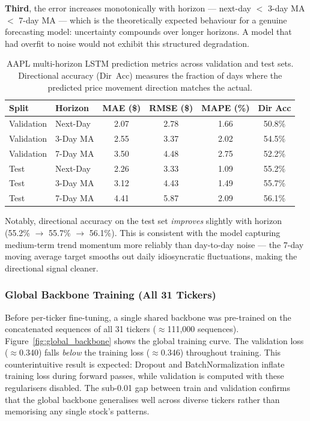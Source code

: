 \documentclass[12pt, a4paper]{article}
\begin{document}
\textbf{Third}, the error increases monotonically with horizon --- next-day
$<$ 3-day MA $<$ 7-day MA --- which is the theoretically expected behaviour
for a genuine forecasting model: uncertainty compounds over longer horizons.
A model that had overfit to noise would not exhibit this structured degradation.

\begin{table}[h]
\centering
\caption{AAPL multi-horizon LSTM prediction metrics across validation and
         test sets. Directional accuracy (Dir~Acc) measures the fraction of
         days where the predicted price movement direction matches the actual.}
\label{tab:multi_horizon_aapl}
\renewcommand{\arraystretch}{1.3}
\begin{tabular}{llcccc}
\hline
\textbf{Split} & \textbf{Horizon}
  & \textbf{MAE (\$)} & \textbf{RMSE (\$)}
  & \textbf{MAPE (\%)} & \textbf{Dir Acc} \\
\hline
Validation & Next-Day & 2.07 & 2.78 & 1.66 & 50.8\% \\
Validation & 3-Day MA & 2.55 & 3.37 & 2.02 & 54.5\% \\
Validation & 7-Day MA & 3.50 & 4.48 & 2.75 & 52.2\% \\
\hline
Test       & Next-Day & 2.26 & 3.33 & 1.09 & 55.2\% \\
Test       & 3-Day MA & 3.12 & 4.43 & 1.49 & 55.7\% \\
Test       & 7-Day MA & 4.41 & 5.87 & 2.09 & 56.1\% \\
\hline
\end{tabular}
\end{table}

Notably, directional accuracy on the test set \emph{improves} slightly with
horizon (55.2\% $\rightarrow$ 55.7\% $\rightarrow$ 56.1\%). This is consistent
with the model capturing medium-term trend momentum more reliably than
day-to-day noise --- the 7-day moving average target smooths out daily
idiosyncratic fluctuations, making the directional signal cleaner.


\subsubsection{Global Backbone Training (All 31 Tickers)}

Before per-ticker fine-tuning, a single shared backbone was pre-trained on
the concatenated sequences of all 31 tickers ($\approx$111,000 sequences).
Figure~\ref{fig:global_backbone} shows the global training curve. The
validation loss ($\approx$0.340) falls \textit{below} the training loss
($\approx$0.346) throughout training. This counterintuitive result is expected:
Dropout and BatchNormalization inflate training loss during forward passes,
while validation is computed with these regularisers disabled. The sub-0.01
gap between train and validation confirms that the global backbone generalises
well across diverse tickers rather than memorising any single stock's patterns.
\end{document}
